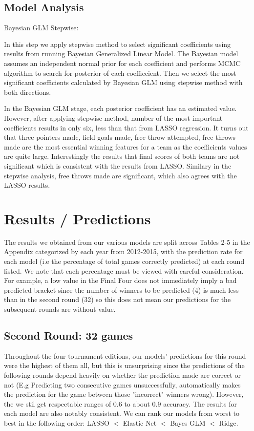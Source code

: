 \documentclass{article} %
\begin{document}
\subsection{Model Analysis}

Bayesian GLM Stepwise:

In this step we apply stepwise method to select significant coefficients using results from running Bayesian Generalized Linear Model. The Bayesian model assumes an independent normal prior for each coefficient and performs MCMC algorithm to search for posterior of each coeffiecient. Then we select the most significant coefficients calculated by Bayesian GLM using stepwise method with both directions.

In the Bayesian GLM stage, each posterior coefficient has an estimated value. However, after applying stepwise method, number of the most important coefficients results in only six, less than that from LASSO regression. It turns out that three pointers made, field goals made, free throw attempted, free throws made are the most essential winning features for a team as the coefficients values are quite large. Interestingly the results that final scores of both teams are not significant which is consistent with the results from LASSO. Similary in the stepwise analysis, free throws made are significant, which also agrees with the LASSO results.

\section{Results / Predictions}

The results we obtained from our various models are split across Tables 2-5 in the Appendix categorized by each year from 2012-2015, with the prediction rate for each model (i.e the percentage of total games correctly predicted) at each round listed. We note that each percentage must be viewed with careful consideration. For example, a low value in the Final Four does not immediately imply a bad predicted bracket since the number of winners to be predicted (4) is much less than in the second round (32) so this does not mean our predictions for the subsequent rounds are without value.

\subsection{Second Round: 32 games}

Throughout the four tournament editions, our models' predictions for this round were the highest of them all, but this is unsurprising since the predictions of the following rounds depend heavily on whether the prediction made are correct or not (E.g Predicting two consecutive games unsuccessfully, automatically makes the prediction for the game between those "incorrect" winners wrong). However, the we stil get respectable ranges of 0.6 to about 0.9 accuracy. The results for each model are also notably consistent. We can rank our models from worst to best in the following order: LASSO $<$ Elastic Net $<$ Bayes GLM $<$ Ridge.
\end{document}
